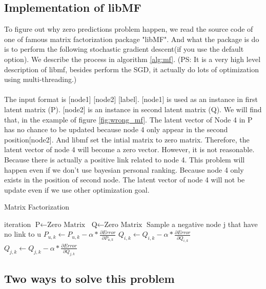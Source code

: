 \documentclass[12pt]{article}
\begin{document}
\subsection {Implementation of libMF}
To figure out why zero predictions problem happen, we read the source code of one of famous matrix factorization package "libMF". And what the package is do is to perform the following stochastic gradient descent(if you use the default option). We describe the process in algorithm \ref{alg:mf}. (PS: It is a very high level description of libmf, besides perform the SGD, it actually do lots of optimization using multi-threading.)
\\
\\
The input format is [node1] [node2] [label]. [node1] is used as an instance in first latent matrix (P). [node2] is an instance in second latent matrix (Q). We will find that, in the example of figure \ref{fig:wrong_mf}. The latent vector of Node 4 in P has no chance to be updated because node 4 only appear in the second position[node2]. And libmf set the intial matrix to zero matrix. Therefore, the latent vector of node 4 will become a zero vector. However, it is not reasonable. Because there is actually a positive link related to node 4. This problem will happen even if we don't use bayesian personal ranking. Because node 4 only exists in the position of second node. The latent vector of node 4 will not be update even if we use other optimization goal.
\begin{algorithm}
	\caption{Matrix Factorization}
	\begin{algorithmic}
		 {iteration}
			\State $\text{P} \gets \text{Zero Matrix}$
			\State $\text{Q} \gets \text{Zero Matrix}$
					\State Sample a negative node j that have no link to u
						\State $P_{u,k} \gets P_{u,k} - \alpha *  \frac{\partial Error}{\partial P_{u,k}}$
						\State $Q_{i,k} \gets Q_{i,k} - \alpha *  \frac{\partial Error}{\partial Q_{i,k}}$
						\State $Q_{j,k} \gets Q_{j,k} - \alpha *  \frac{\partial Error}{\partial Q_{j,k}}$
					\EndFor
				\EndFor
			\EndFor
		\EndProcedure
	\end{algorithmic}
	\label{alg:mf}
\end{algorithm}


\subsection{Two ways to solve this problem}
\end{document}
